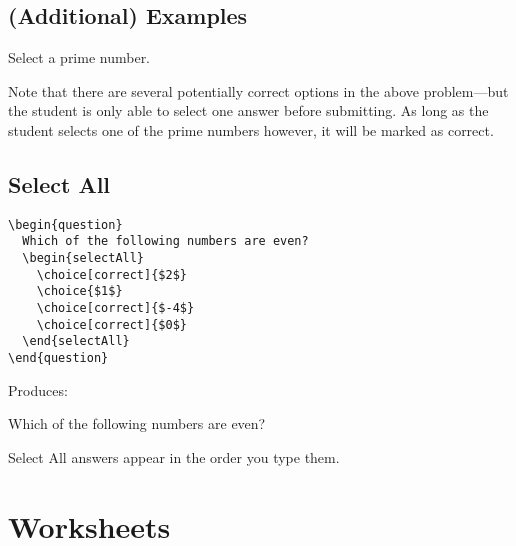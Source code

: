 \documentclass{ximera}
\begin{document}
\subsection{(Additional) Examples}

\begin{problem}
Select a prime number.
\begin{multipleChoice}
\end{multipleChoice}
\end{problem}

Note that there are several potentially correct options in the above
problem---but the student is only able to select one answer before submitting.
As long as the student selects one of the prime numbers however, it will be
marked as correct.

\subsection{Select All}

\begin{example}
  \begin{verbatim}
\begin{question}
  Which of the following numbers are even?
  \begin{selectAll}
    \choice[correct]{$2$}
    \choice{$1$}
    \choice[correct]{$-4$}
    \choice[correct]{$0$}
  \end{selectAll}
\end{question}
\end{verbatim}
\end{example}

Produces:

\begin{question}
  Which of the following numbers are even?
  \begin{selectAll}
  \end{selectAll}
\end{question}

\begin{remark}
  Select All answers appear in the order you type them.
\end{remark}

\section{Worksheets}
\end{document}
